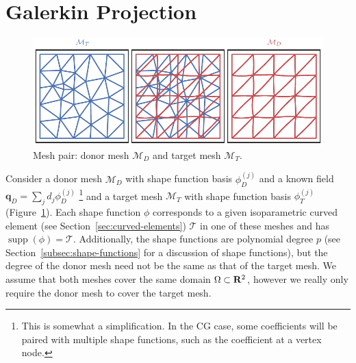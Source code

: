 \section{Galerkin Projection}

\begin{figure}
  \includegraphics{../images/solution-transfer/main_figure00.pdf}
  \centering
  \captionsetup{width=.75\linewidth}
  \caption{Mesh pair: donor mesh \(\mathcal{M}_D\) and
    target mesh \(\mathcal{M}_T\).}
  \label{fig:donor-target-pair}
\end{figure}

Consider a donor mesh \(\mathcal{M}_D\) with shape function basis
\(\phi_D^{(j)}\) and a known field \(\bm{q}_D = \sum_j d_j \phi_D^{(j)}\)
\footnote{This is somewhat a simplification. In the CG case,
some coefficients will be paired with multiple shape functions, such
as the coefficient at a vertex node.}
and a
target mesh \(\mathcal{M}_T\) with shape function basis \(\phi_T^{(j)}\)
(Figure~\ref{fig:donor-target-pair}).
Each shape function \(\phi\) corresponds to a
given isoparametric curved element (see Section~\ref{sec:curved-elements})
\(\mathcal{T}\) in one of these meshes and has
\(\operatorname{supp}(\phi) = \mathcal{T}\).
Additionally, the shape functions are polynomial degree \(p\) (see
Section~\ref{subsec:shape-functions} for a discussion of shape functions),
but the degree of the donor mesh need not be the same as that of the
target mesh. We assume that both meshes cover the same domain \(\Omega \subset
\mathbf{R}^2\), however we really only require the donor mesh to cover the
target mesh.

